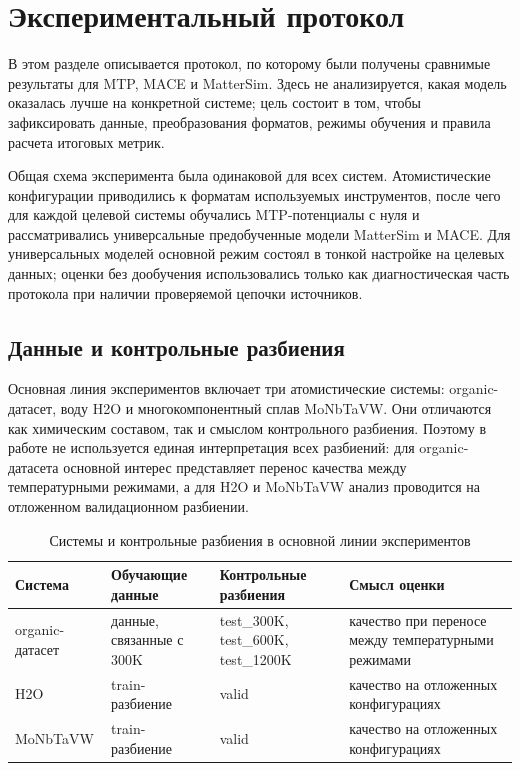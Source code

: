 \section{Экспериментальный протокол}

В этом разделе описывается протокол, по которому были получены сравнимые результаты для MTP, MACE и MatterSim. Здесь не анализируется, какая модель оказалась лучше на конкретной системе; цель состоит в том, чтобы зафиксировать данные, преобразования форматов, режимы обучения и правила расчета итоговых метрик.

Общая схема эксперимента была одинаковой для всех систем. Атомистические конфигурации приводились к форматам используемых инструментов, после чего для каждой целевой системы обучались MTP-потенциалы с нуля и рассматривались универсальные предобученные модели MatterSim и MACE. Для универсальных моделей основной режим состоял в тонкой настройке на целевых данных; оценки без дообучения использовались только как диагностическая часть протокола при наличии проверяемой цепочки источников.

\subsection{Данные и контрольные разбиения}

Основная линия экспериментов включает три атомистические системы: organic-датасет, воду H2O и многокомпонентный сплав MoNbTaVW. Они отличаются как химическим составом, так и смыслом контрольного разбиения. Поэтому в работе не используется единая интерпретация всех разбиений: для organic-датасета основной интерес представляет перенос качества между температурными режимами, а для H2O и MoNbTaVW анализ проводится на отложенном валидационном разбиении.

\begin{table}[h]
\centering
\small
\caption{Системы и контрольные разбиения в основной линии экспериментов}
\label{tab:protocol_datasets_splits}
\begin{tabularx}{\textwidth}{@{}l>{\raggedright\arraybackslash}X>{\raggedright\arraybackslash}X>{\raggedright\arraybackslash}X@{}}
\toprule
Система & Обучающие данные & Контрольные разбиения & Смысл оценки \\
\midrule
organic-датасет & данные, связанные с 300K & test\_300K, test\_600K, test\_1200K & качество при переносе между температурными режимами \\
H2O & train-разбиение & valid & качество на отложенных конфигурациях \\
MoNbTaVW & train-разбиение & valid & качество на отложенных конфигурациях \\
\bottomrule
\end{tabularx}
\end{table}

